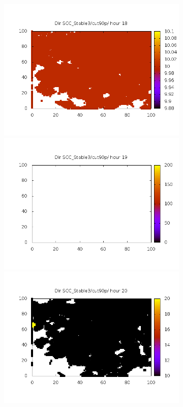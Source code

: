 \documentclass[10pt,a4paper]{article}
\begin{document}
\begin{figure}
\begin{subfigure}[b]{1\textwidth}
\includegraphics[scale=.20]{./img/SCC_Stable3/cut90p/18.png}
\includegraphics[scale=.20]{./img/SCC_Stable3/cut90p/19.png}
\includegraphics[scale=.20]{./img/SCC_Stable3/cut90p/20.png}

\end{subfigure}
\end{figure}
\end{document}

